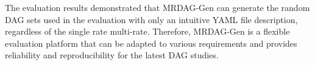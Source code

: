 The evaluation results demonstrated that MRDAG-Gen can generate the random DAG sets used in the evaluation with only an intuitive YAML file description, regardless of the single rate multi-rate.
Therefore, MRDAG-Gen is a flexible evaluation platform that can be adapted to various requirements and provides reliability and reproducibility for the latest DAG studies.
